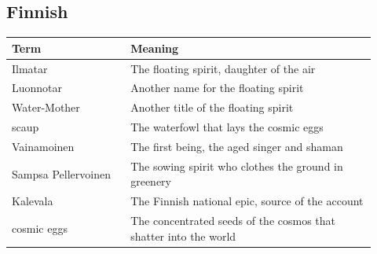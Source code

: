 \subsection{Finnish}

\begin{longtable}{L{0.30\linewidth} L{0.62\linewidth}}
\toprule
\textbf{Term} & \textbf{Meaning} \\
\midrule
\endhead
Ilmatar & The floating spirit, daughter of the air \\
Luonnotar & Another name for the floating spirit \\
Water-Mother & Another title of the floating spirit \\
scaup & The waterfowl that lays the cosmic eggs \\
Vainamoinen & The first being, the aged singer and shaman \\
Sampsa Pellervoinen & The sowing spirit who clothes the ground in greenery \\
Kalevala & The Finnish national epic, source of the account \\
cosmic eggs & The concentrated seeds of the cosmos that shatter into the world \\
\bottomrule
\end{longtable}

